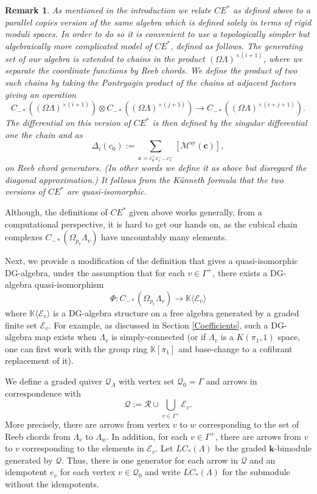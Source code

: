 \documentclass{gtpart}
\newtheorem{rem}[thm]{Remark}
\renewcommand{\k}{\mathbf{k}}
\newcommand{\K}{\mathbb{K}}
\newcommand{\sy}{\mathrm{sy}}
\begin{document}
\begin{rem}\label{r:topologicalversion}
As mentioned in the introduction we relate $CE^{\ast}$ as defined above to a parallel copies version
    of the same algebra which is defined solely in terms of rigid moduli spaces. In order to do so
    it is convenient to use a topologically simpler but algebraically more complicated model of
    $CE^{\ast}$, defined as follows. The generating set of our algebra is extended to chains in the
    product $(\Omega \Lambda)^{\times (i+1)}$, where we separate the coordinate functions by Reeb chords. We define the product of two such chains by taking the Pontryagin product of the chains at adjacent factors giving an operation 
\[ 
    C_{-\ast}((\Omega \Lambda)^{\times (i+1)})\otimes C_{-\ast}((\Omega
    \Lambda)^{\times(j+1)})\to
    C_{-\ast}((\Omega \Lambda)^{\times(i+j+1)}).
\]
The differential on this version of $CE^{\ast}$ is then defined by the singular differential one the chain and as
\[ 
\Delta_i(c_0) := \sum_{\mathbf{c}=c_0^{+}c_i^{-}\dots c_1^{-}} [\mathcal{M}^{\sy}(\mathbf{c})],
\]
on Reeb chord generators. (In other words we define it as above but disregard the diagonal
    approximation.) It follows from the K\"unneth formula that the two versions of $CE^{\ast}$ are quasi-isomorphic.    
\end{rem}

Although, the definitions of $CE^*$ given above works generally, from a computational
perspective, it is hard to get our hands on, as the cubical chain complexes $C_{-*}(\Omega_{p_v} \Lambda_v)$ have uncountably many elements. 

Next, we provide a modification of the definition that gives a quasi-isomorphic DG-algebra, under the assumption that for each $v\in
\Gamma^+$, there exists a
DG-algebra quasi-isomorphism 
\[ \Phi \colon C_{-*}(\Omega_{p_v} \Lambda_v) \to \K \langle \mathcal{E}_v \rangle \] 
where $\K \langle \mathcal{E}_v \rangle$ is a DG-algebra structure on a free algebra generated by a
graded finite set $\mathcal{E}_v$. For example, as
discussed in Section \ref{Coefficients}, such a DG-algebra map exists when $\Lambda_v$ is
simply-connected (or if $\Lambda_v$ is a $K(\pi_1,1)$ space, one can first work with the group ring
$\K[\pi_1]$ and base-change to a cofibrant replacement of it). 

We define a graded quiver $\mathcal{Q}_\Lambda$ with vertex set $\mathcal{Q}_0 = \Gamma$ and arrows in correspondence with
\[ \mathcal{Q} := \mathcal{R} \cup \bigcup_{v \in \Gamma^+} \mathcal{E}_v. \] 
More precisely, there are arrows from vertex $v$ to $w$ corresponding to the set of Reeb chords from
$\Lambda_v$ to $\Lambda_w$. In addition, for each $v \in \Gamma^{+}$, there are arrows from $v$ to $v$ corresponding to the elements in $\mathcal{E}_v$. 
Let $LC_*(\Lambda)$ be the graded $\k$-bimodule generated by $\mathcal{Q}$. Thus, there is one generator for each arrow in $\mathcal{Q}$ and an idempotent $e_v$ for each vertex $v \in \mathcal{Q}_0$ and write $\overline{LC}_{\ast}(\Lambda)$ for the submodule without the idempotents.
\end{document}
